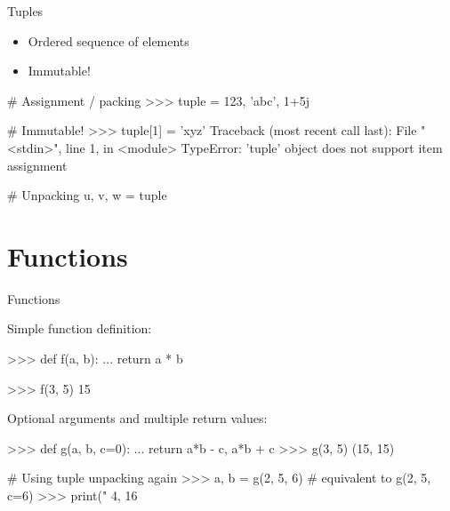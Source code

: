 \documentclass[10pt]{beamer}
\begin{document}

\begin{frame}[fragile]{Tuples}

\begin{itemize}
\item  Ordered sequence of elements
\item  Immutable!
\end{itemize}

\begin{pythoncode}
# Assignment / packing
>>> tuple = 123, 'abc', 1+5j
\end{pythoncode}



\begin{pythoncode}
# Immutable!
>>> tuple[1] = 'xyz'
Traceback (most recent call last):
File "<stdin>", line 1, in <module>
TypeError: 'tuple' object does not support item assignment
\end{pythoncode}



\begin{pythoncode}
# Unpacking
u, v, w = tuple
\end{pythoncode}

\end{frame}


\section{Functions}


\begin{frame}[fragile]{Functions}

Simple function definition:

\begin{pythoncode}
>>> def f(a, b):
...     return a * b

>>> f(3, 5)
15
\end{pythoncode}



Optional arguments and multiple return values:

\begin{pythoncode}
>>> def g(a, b, c=0):
...     return a*b - c, a*b + c
>>> g(3, 5)
(15, 15)

# Using tuple unpacking again
>>> a, b = g(2, 5, 6)  # equivalent to g(2, 5, c=6)
>>> print("%
4, 16
\end{pythoncode}

\end{frame}
\end{document}
